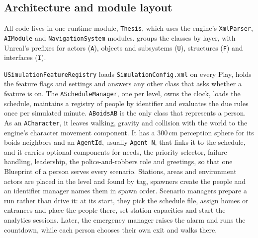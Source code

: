 \subsection{Architecture and module layout}\label{sec:arch-modules}

All code lives in one runtime module, \texttt{Thesis}, which uses the engine's \texttt{XmlParser}, \texttt{AIModule} and \texttt{NavigationSystem} modules.  groups the classes by layer, with Unreal's prefixes for actors (\texttt{A}), objects and subsystems (\texttt{U}), structures (\texttt{F}) and interfaces (\texttt{I}).

\texttt{USimulationFeatureRegistry} loads \texttt{SimulationConfig.xml} on every Play, holds the feature flags and settings and answers any other class that asks whether a feature is on. The \texttt{AScheduleManager}, one per level, owns the clock, loads the schedule, maintains a registry of people by identifier and evaluates the due rules once per simulated minute. \texttt{ABoidsAB} is the only class that represents a person. As an \texttt{ACharacter}, it leaves walking, gravity and collision with the world to the engine's character movement component. It has a 300\,cm perception sphere for its boids neighbors and an \texttt{AgentId}, usually \texttt{Agent\_N}, that links it to the schedule, and it carries optional components for needs, the priority selector, failure handling, leadership, the police-and-robbers role and greetings, so that one Blueprint of a person serves every scenario. Stations, areas and environment actors are placed in the level and found by tag, spawners create the people and an identifier manager names them in spawn order. Scenario managers prepare a run rather than drive it: at its start, they pick the schedule file, assign homes or entrances and place the people there, set station capacities and start the analytics sessions. Later, the emergency manager raises the alarm and runs the countdown, while each person chooses their own exit and walks there.

